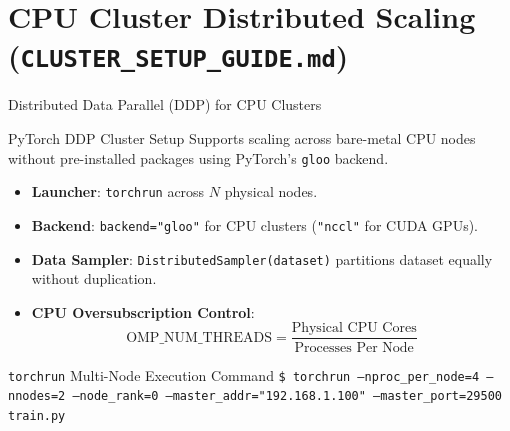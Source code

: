 \documentclass[t]{beamer}
\begin{document}
\section{CPU Cluster Distributed Scaling (\texttt{CLUSTER\_SETUP\_GUIDE.md})}

\begin{frame}{Distributed Data Parallel (DDP) for CPU Clusters}
    \begin{block}{PyTorch DDP Cluster Setup}
        Supports scaling across bare-metal CPU nodes without pre-installed packages using PyTorch's \texttt{gloo} backend.
    \end{block}

    \begin{itemize}
        \item \textbf{Launcher}: \texttt{torchrun} across $N$ physical nodes.
        \item \textbf{Backend}: \texttt{backend="gloo"} for CPU clusters (\texttt{"nccl"} for CUDA GPUs).
        \item \textbf{Data Sampler}: \texttt{DistributedSampler(dataset)} partitions dataset equally without duplication.
        \item \textbf{CPU Oversubscription Control}:
          $$\text{OMP\_NUM\_THREADS} = \frac{\text{Physical CPU Cores}}{\text{Processes Per Node}}$$
    \end{itemize}

    \begin{exampleblock}{\texttt{torchrun} Multi-Node Execution Command}
        \texttt{\$ torchrun --nproc\_per\_node=4 --nnodes=2 --node\_rank=0 --master\_addr="192.168.1.100" --master\_port=29500 train.py}
    \end{exampleblock}
\end{frame}
\end{document}
